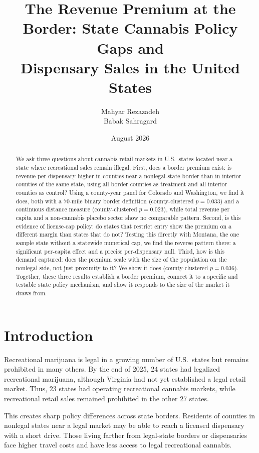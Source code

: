 \documentclass[12pt]{article}
\title{The Revenue Premium at the Border: State Cannabis Policy Gaps and\\
Dispensary Sales in the United States}
\author{Mahyar Rezazadeh \\ Babak Sahragard}
\date{August 2026}
\begin{document}
\maketitle

\begin{abstract}
\noindent We ask three questions about cannabis retail markets in U.S.\ states located near a state where
recreational sales remain illegal. First, does a border premium exist: is revenue per dispensary higher in
counties near a nonlegal-state border than in interior counties of the same state, using all border counties
as treatment and all interior counties as control? Using a county-year panel for Colorado and Washington, we
find it does, both with a 70-mile binary border definition (county-clustered $p=0.033$) and a continuous
distance measure (county-clustered $p=0.023$), while total revenue per capita and a non-cannabis placebo
sector show no comparable pattern. Second, is this evidence of license-cap policy: do states that restrict
entry show the premium on a different margin than states that do not? Testing this directly with Montana, the
one sample state without a statewide numerical cap, we find the reverse pattern there: a significant
per-capita effect and a precise per-dispensary null. Third, how is this demand captured: does the premium
scale with the size of the population on the nonlegal side, not just proximity to it? We show it does
(county-clustered $p=0.036$). Together, these three results establish a border premium, connect it to a
specific and testable state policy mechanism, and show it responds to the size of the market it draws from.
\end{abstract}

\section{Introduction}

Recreational marijuana is legal in a growing number of U.S.\ states but remains prohibited in many others.
By the end of 2025, 24 states had legalized recreational marijuana, although Virginia had not yet
established a legal retail market. Thus, 23 states had operating recreational cannabis markets, while
recreational retail sales remained prohibited in the other 27 states.

This creates sharp policy differences across state borders. Residents of counties in nonlegal states near a
legal market may be able to reach a licensed dispensary with a short drive. Those living farther from
legal-state borders or dispensaries face higher travel costs and have less access to legal recreational
cannabis.
\end{document}
